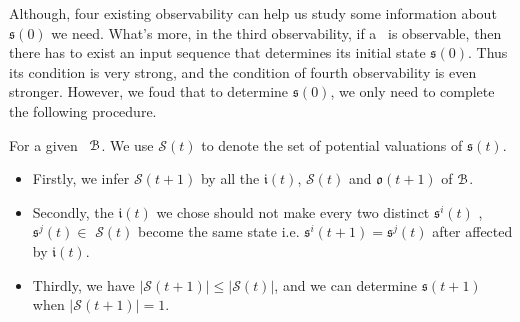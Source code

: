 
\begin{comment}
\ly{In the four existing observability, we can not determine the initial state of \BCNs\ by the first and second observability.} Although we can determine the initail state of \BCNs\ by the third and fourth observability, the requirements for \BCNs\ to determine the initail state are difficult to meet. Thus, we consider that whether we can determine the initial state of some \BCNs\ which can not be determined by the third and fourth observability.
\end{comment}
Although, four existing observability can help us study some information about $\mathfrak{s}(0)$ we need. %
What's more, in the third observability, if a \BCN\ is observable, then there has to exist an input sequence that determines its initial state $\mathfrak{s}(0)$. Thus its condition is very strong, and the condition of fourth observability is even stronger. However, we foud that to determine $\mathfrak{s}(0)$, we only need to complete the following procedure.

For a given \BCN\  ${\mathcal{B}}$.  We use $\mathcal{S}(t)$ to denote the set of potential valuations of $\mathfrak{s}(t)$.
\begin{itemize}
	\item  Firstly, we infer $\mathcal{S}(t+1)$ by all the $\mathfrak{i}(t)$, $\mathcal{S}(t)$ and $\mathfrak{o}(t+1)$ of ${\mathcal{B}}$.
	\item Secondly, the $\mathfrak{i}(t)$ we chose should not make every two distinct $\mathfrak{s}^{i}(t)$ , $\mathfrak{s}^{j}(t)$$\in$ $\mathcal{S}(t)$ become the same state i.e. $\mathfrak{s}^{i}(t+1)=$$\mathfrak{s}^{j}(t)$ after affected by $\mathfrak{i}(t)$.  
	\item Thirdly, we have $|$$\mathcal{S}(t+1)$$|\le|$$\mathcal{S}(t)$$|$, and we can determine $\mathfrak{s}(t+1)$ when $|$$\mathcal{S}(t+1)$$|=1$.
\end{itemize}

